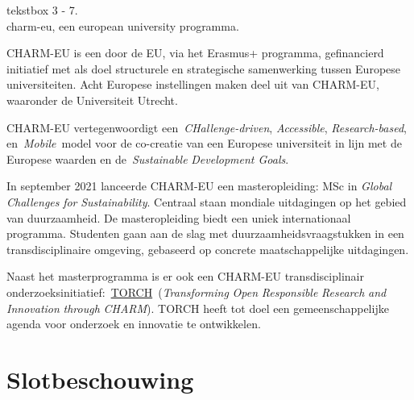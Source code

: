 \documentclass[smallauthor, chapterhaspagenum, nochapterinheader, pagenuminheader,  bigchapnum,medium2, tocpages, garamond, titleinheader]{jote-book}
\begin{document}
	\enlargethispage{\baselineskip}\checkandfixthelayout\enlargethispage{\baselineskip}\checkandfixthelayout\enlargethispage{\baselineskip}\checkandfixthelayout
	\begin{bookbox}{\raggedright tekstbox 3 - 7. \\charm-eu, een european university programma.}
		CHARM-EU is een door de EU, via het Erasmus+ programma, gefinancierd initiatief met als doel structurele en strategische samenwerking tussen Europese universiteiten. Acht Europese instellingen maken deel uit van CHARM-EU, waaronder de Universiteit Utrecht.

		\vspace*{\baselineskip}

		CHARM-EU vertegenwoordigt een \emph{CH}\emph{allenge-driven}, \emph{A}\emph{ccessible}, \emph{R}\emph{esearch-}\emph{based}, en \emph{M}\emph{obile} model voor de co-creatie van een Europese universiteit in lijn met de Europese waarden en de \emph{Sustainable}\emph{ Development Goals}.

		\vspace*{\baselineskip}

		In september 2021 lanceerde CHARM-EU een masteropleiding: MSc in \emph{Global }\emph{Challenges}\emph{ }\emph{for}\emph{ }\emph{Sustainability}. Centraal staan mondiale uitdagingen op het gebied van duurzaamheid. De masteropleiding biedt een uniek internationaal programma. Studenten gaan aan de slag met duurzaamheidsvraagstukken in een transdisciplinaire omgeving, gebaseerd op concrete maatschappelijke uitdagingen.

		\vspace*{\baselineskip}

		Naast het masterprogramma is er ook een CHARM-EU transdisciplinair onderzoeksinitiatief: \href{https://www.charm-eu.eu/torch}{TORCH} (\emph{Transforming}\emph{ Open }\emph{Responsible}\emph{ Research }\emph{and}\emph{ }\emph{Innovation}\emph{ }\emph{through}\emph{ CHARM}). TORCH heeft tot doel een gemeenschappelijke agenda voor onderzoek en innovatie te ontwikkelen.
	\end{bookbox}\enlargethispage{\baselineskip}\checkandfixthelayout

	\section{Slotbeschouwing}
\end{document}
